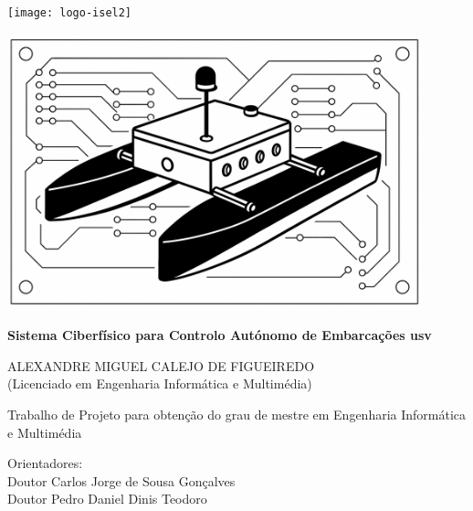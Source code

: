 
\linespread{1.0}

\begin{titlepage}
	\vspace*{-2.0cm}
	\begin{center}
		\texttt{[image: logo-isel2]}\\\vspace{6pt}
	\end{center}
	
	\begin{center}
		\includegraphics[width=12cm]{figuras/usv-2d.png}
	\end{center}\vspace{6pt}
	
	\begin{center}
		\LARGE
		\textbf{Sistema Ciberfísico para Controlo Autónomo de Embarcações \acrlong{usv}}\\\vspace{24pt}
		
		\Large
		ALEXANDRE MIGUEL CALEJO DE FIGUEIREDO\\
		\large
		(Licenciado em Engenharia Informática e Multimédia)\\\vspace{24pt}
		
		\normalsize
		Trabalho de Projeto para obtenção do grau de mestre em Engenharia Informática e Multimédia
	\end{center}\vspace{12pt}
	
	\normalsize
	\noindent\hspace*{3.5cm}
	Orientadores:\\
	\noindent\hspace*{5.5cm}
	Doutor Carlos Jorge de Sousa Gonçalves\\
	\noindent\hspace*{5.5cm}
	Doutor Pedro Daniel Dinis Teodoro\\
	

\end{titlepage}
